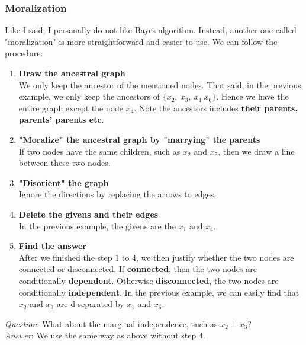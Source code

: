 \subsubsection*{Moralization}
Like I said, I personally do not like Bayes algorithm. Instead, another one called "moralization" is more straightforward and easier to use. We can follow the procedure:
\begin{enumerate}
    \item \textbf{Draw the ancestral graph}\\
    We only keep the ancestor of the mentioned nodes. That said, in the previous example, we only keep the ancestors of $\{x_2,\:x_3,\:x_1\:x_6\}$. Hence we have the entire graph except the node $x_4$. Note the ancestors includes \textbf{their parents, parents' parents etc}.
    \item \textbf{"Moralize" the ancestral graph by "marrying" the parents}\\
    If two nodes have the same children, such as $x_2$ and $x_5$, then we draw a line between these two nodes.
    \item \textbf{"Disorient" the graph}\\
    Ignore the directions by replacing the arrows to edges.
    \item \textbf{Delete the givens and their edges}\\
    In the previous example, the givens are the $x_1$ and $x_4$.
    \item \textbf{Find the answer}\\
    After we finished the step 1 to 4, we then justify whether the two nodes are connected or disconnected. If \textbf{connected}, then the two nodes are conditionally \textbf{dependent}. Otherwise \textbf{disconnected}, the two nodes are conditionally \textbf{independent}. In the previous example, we can easily find that $x_2$ and $x_3$ are d-separated by $x_1$ and $x_6$.
\end{enumerate}
\textit{Question}: What about the marginal independence, such as $x_2\perp x_3$?\\
\textit{Answer}: We use the same way as above without step 4.

